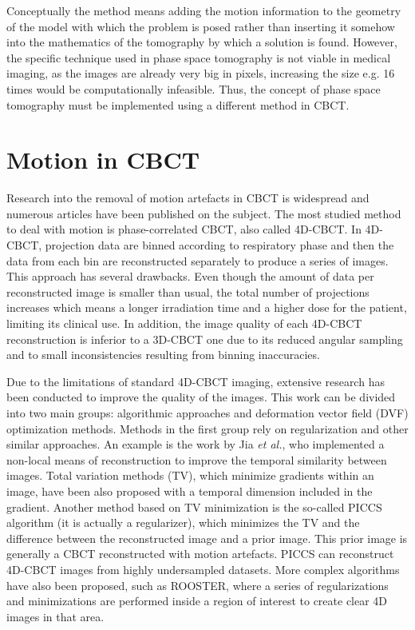  Conceptually the method means adding the motion information to the geometry of the model with which the problem is posed rather than inserting it somehow into the mathematics of the tomography by which a solution is found. However, the specific technique used in phase space tomography is not viable in medical imaging, as the images are already very big in pixels, increasing the size e.g. 16 times would be computationally infeasible. Thus, the concept of phase space tomography must be implemented using a different method in CBCT.

\section{Motion in CBCT}
 Research into the removal of motion artefacts in CBCT is widespread and numerous articles have been published on the subject.  The most studied method to deal with motion is phase-correlated CBCT, also called 4D-CBCT\cite{sonke2005respiratory}\cite{thomas2006}\cite{li2006four}\cite{Pengpan2012246}\cite{t2016first}.  In 4D-CBCT, projection data are binned according to respiratory phase and then the data from each bin are reconstructed separately to produce a series of images.  This approach has several drawbacks.  Even though the amount of data per reconstructed image is smaller than usual, the total number of projections increases which means a longer irradiation time and a higher dose for the patient, limiting its clinical use.  In addition, the image quality of each 4D-CBCT reconstruction is inferior to a 3D-CBCT one due to its reduced angular sampling and to small inconsistencies resulting from binning inaccuracies. 

Due to the limitations of standard 4D-CBCT imaging, extensive research has been conducted to improve the quality of the images.  This work can be divided into two main groups: algorithmic approaches and deformation vector field (DVF) optimization methods.  Methods in the first group rely on regularization and other similar approaches.  An example is the work by Jia \textit{et al.}\cite{jia2012}, who implemented a non-local means of reconstruction to improve the temporal similarity between images.  Total variation methods (TV)\cite{ASD_POCS}, which minimize gradients within an image, have been also proposed with a temporal dimension included in the gradient\cite{0031-9155-57-6-1517}.  Another method based on TV minimization is the so-called PICCS algorithm\cite{chen2008prior}\cite{0031-9155-53-20-006}\cite{chen2012time} (it is actually a regularizer), which minimizes the TV and the difference between the reconstructed image and a prior image.  This prior image is generally a CBCT reconstructed with motion artefacts.  PICCS can reconstruct 4D-CBCT images from highly undersampled datasets.  More complex algorithms have also been proposed, such as ROOSTER\cite{:/content/aapm/journal/medphys/41/2/10.1118/1.4860215}, where a series of regularizations and minimizations are performed inside a region of interest to create clear 4D images in that area.

